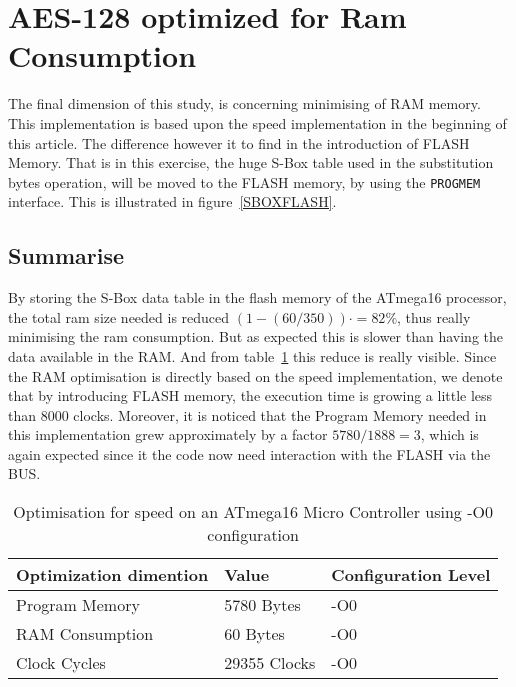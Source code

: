 \documentclass[Report.tex]{subfiles}
\begin{document}
\section{AES-128 optimized for Ram Consumption}
The final dimension of this  study, is concerning 
minimising of RAM memory. This implementation
is based upon the speed implementation in the beginning of this article.
The difference however it to find in the introduction of FLASH Memory.
That is in this exercise, the huge S-Box table used in the substitution bytes operation,
will be moved to the FLASH memory, by using the \verb+PROGMEM+ interface. This
is illustrated in figure~\ref{SBOXFLASH}.


\subsection{Summarise}
By storing the S-Box data table in the flash memory of the 
ATmega16 processor, the total ram size needed is reduced
$(1-(60/350))\cdot = 82\%$, thus really minimising the ram consumption.
But as expected this is slower than having the data available in the RAM.
And from table~\ref{OPTram} this reduce is really visible. Since the RAM
optimisation is directly based on the speed implementation, we denote that
by introducing FLASH memory, the execution time is growing a little less
than 8000 clocks. Moreover, it is noticed that the Program Memory needed in
this implementation grew approximately by a factor $5780/1888 = 3$, which is again expected
since it the code now need interaction with the FLASH via the BUS.

\begin{table}[h]
\centering
    \begin{tabular}{|l|l|l|}
    \hline
    Optimization dimention 	& Value       			& Configuration Level 	\\ \hline
    Program Memory         	& 5780 Bytes   		& -O0                 		\\ \hline
    RAM Consumption        	& 60 Bytes    		& -O0                 		\\ \hline
    Clock Cycles           		& 29355 Clocks 		& -O0                 			\\ \hline
    \end{tabular}
    \caption{\label{OPTram} Optimisation for speed on an ATmega16 Micro Controller using -O0 configuration}
\end{table}
\end{document}
